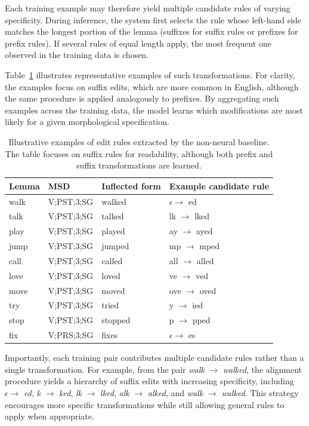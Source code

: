 Each training example may therefore yield multiple candidate rules of varying specificity. During inference, the system first selects the rule whose left-hand side matches the longest portion of the lemma (suffixes for suffix rules or prefixes for prefix rules). If several rules of equal length apply, the most frequent one observed in the training data is chosen.

Table~\ref{tab:rule_examples} illustrates representative examples of such transformations. For clarity, the examples focus on suffix edits, which are more common in English, although the same procedure is applied analogously to prefixes. By aggregating such examples across the training data, the model learns which modifications are most likely for a given morphological specification.

\begin{table}[h]
\centering
\begin{tabular}{llll}
\toprule
Lemma & \acs{MSD} & Inflected form & Example candidate rule \\
\midrule
walk  & V;PST;3;SG & walked  & $\epsilon \rightarrow$ ed \\
talk  & V;PST;3;SG & talked  & lk $\rightarrow$ lked \\
play  & V;PST;3;SG & played  & ay $\rightarrow$ ayed \\
jump  & V;PST;3;SG & jumped  & mp $\rightarrow$ mped \\
call  & V;PST;3;SG & called  & all $\rightarrow$ alled \\
love  & V;PST;3;SG & loved   & ve $\rightarrow$ ved \\
move  & V;PST;3;SG & moved   & ove $\rightarrow$ oved \\
try   & V;PST;3;SG & tried   & y $\rightarrow$ ied \\
stop  & V;PST;3;SG & stopped & p $\rightarrow$ pped \\
fix   & V;PRS;3;SG & fixes   & $\epsilon \rightarrow$ es \\
\bottomrule
\end{tabular}
\caption{Illustrative examples of edit rules extracted by the non-neural baseline. The table focuses on suffix rules for readability, although both prefix and suffix transformations are learned.}
\label{tab:rule_examples}
\end{table}

Importantly, each training pair contributes multiple candidate rules rather than a single transformation. For example, from the pair \textit{walk} $\rightarrow$ \textit{walked}, the alignment procedure yields a hierarchy of suffix edits with increasing specificity, including $\epsilon \rightarrow$ \textit{ed}, \textit{k} $\rightarrow$ \textit{ked}, \textit{lk} $\rightarrow$ \textit{lked}, \textit{alk} $\rightarrow$ \textit{alked}, and \textit{walk} $\rightarrow$ \textit{walked}. This strategy encourages more specific transformations while still allowing general rules to apply when appropriate.

